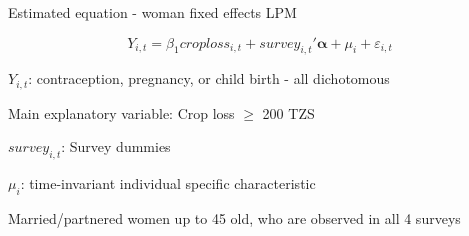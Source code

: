 \documentclass[red]{beamer}
\begin{document}
\begin{frame}{Estimated equation - woman fixed effects LPM}

\begin{equation*}
Y_{i,t} 
=  \beta_1 croploss_{i,t}  
+ survey_{i,t}'\mathbf{\alpha} 
+ \mu_i 
+ \varepsilon_{i,t} 
\end{equation*}





$Y_{i,t}$:  contraception, pregnancy, or child birth - all dichotomous 


\bigskip

Main explanatory variable: Crop loss $\geq$ 200 TZS

\bigskip

% 

$survey_{i,t}$: Survey dummies


\bigskip
 
$\mu_i$: time-invariant individual specific characteristic



\bigskip
Married/partnered women up to 45 old, who are observed in all 4 surveys


\end{frame}
\end{document}
